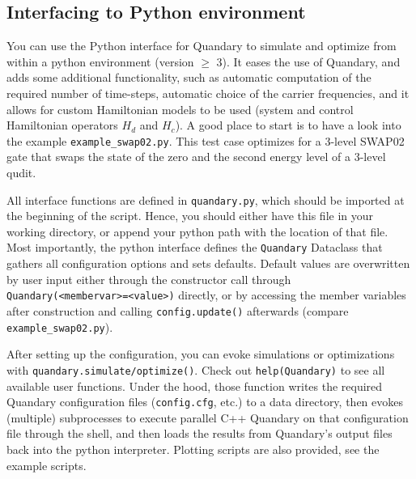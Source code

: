 \documentclass[11pt]{article}
\begin{document}
\subsection{Interfacing to Python environment}
You can use the Python interface for Quandary to simulate and optimize from within a python environment (version $\geq$ 3). It eases the use of Quandary, and adds some additional functionality, such as automatic computation of the required number of time-steps, automatic choice of the carrier frequencies, and it allows for custom Hamiltonian models to be used (system and control Hamiltonian operators $H_d$ and $H_c$). A good place to start is to have a look into the example \texttt{example\_swap02.py}. This test case optimizes for a 3-level SWAP02 gate that swaps the state of the zero and the second energy level of a 3-level qudit. 

All interface functions are defined in \texttt{quandary.py}, which should be imported at the beginning of the script. Hence, you should either have this file in your working directory, or append your python path with the location of that file.
Most importantly, the python interface defines the \texttt{Quandary} Dataclass that gathers all configuration options and sets defaults. Default values are overwritten by user input either through the constructor call through \texttt{Quandary(<membervar>=<value>)} directly, or by accessing the member variables after construction and calling \texttt{config.update()} afterwards (compare \texttt{example\_swap02.py}). 

After setting up the configuration, you can evoke simulations or optimizations with \texttt{quandary.\-simulate/\-optimize()}. Check out \texttt{help(Quandary)} to see all available user functions. Under the hood, those function writes the required Quandary configuration files (\texttt{config.cfg}, etc.) to a data directory, then evokes (multiple) subprocesses to execute parallel C++ Quandary on that configuration file through the shell, and then loads the results from Quandary's output files back into the python interpreter. Plotting scripts are also provided, see the example scripts.
\end{document}
